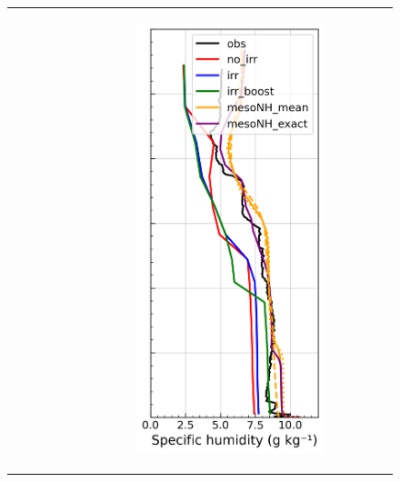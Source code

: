 \begin{figure}[hbtp]
{\begin{tabular}{@{}cccc@{}}
\begin{subfigure}[t]{0.285\textwidth}
        \end{subfigure} &
        \begin{subfigure}[t]{0.29\textwidth}
            \caption{}
            \includegraphics[width=\textwidth]{images/chap5/profiles/profile_cendrosa_ovap_2007_sensbins.png}

\end{subfigure}
\end{tabular}}
\end{figure}
